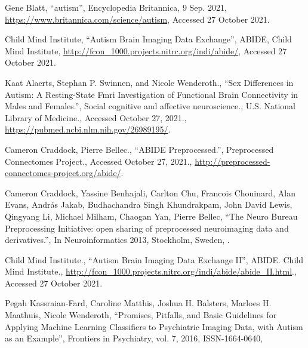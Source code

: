 \begin{thebibliography}{9}

Gene Blatt,
``autism'',
Encyclopedia Britannica,
9 Sep. 2021,
\url{https://www.britannica.com/science/autism},
Accessed 27 October 2021.

Child Mind Institute,
``Autism Brain Imaging Data Exchange'',
ABIDE,
Child Mind Institute,
\url{http://fcon_1000.projects.nitrc.org/indi/abide/},
Accessed 27 October 2021.

Kaat Alaerts, Stephan P. Swinnen, and Nicole Wenderoth.,
``Sex Differences in Autism: A Resting-State Fmri Investigation of Functional Brain Connectivity in Males and Females.'',
Social cognitive and affective neuroscience.,
U.S. National Library of Medicine.,
Accessed October 27, 2021.,
\url{https://pubmed.ncbi.nlm.nih.gov/26989195/}.

Cameron Craddock, Pierre Bellec.,
``ABIDE Preprocessed.'',
Preprocessed Connectomes Project.,
Accessed October 27, 2021.,
\url{http://preprocessed-connectomes-project.org/abide/}.

Cameron Craddock, Yassine Benhajali, Carlton Chu, Francois Chouinard, Alan Evans, András Jakab, Budhachandra Singh Khundrakpam, John David Lewis, Qingyang Li, Michael Milham, Chaogan Yan, Pierre Bellec,
``The Neuro Bureau Preprocessing Initiative: open sharing of preprocessed neuroimaging data and derivatives.'',
In Neuroinformatics 2013,
Stockholm, Sweden,
.

Child Mind Institute.,
``Autism Brain Imaging Data Exchange II'',
ABIDE. Child Mind Institute., \url{http://fcon_1000.projects.nitrc.org/indi/abide/abide_II.html}.,
Accessed 27 October 2021.

Pegah Kassraian-Fard, Caroline Matthis, Joshua H. Balsters, Marloes H. Maathuis, Nicole Wenderoth,
``Promises, Pitfalls, and Basic Guidelines for Applying Machine Learning Classifiers to Psychiatric Imaging Data, with Autism as an Example'',
Frontiers in Psychiatry,
vol. 7,
2016,
ISSN-1664-0640,


\end{thebibliography}

